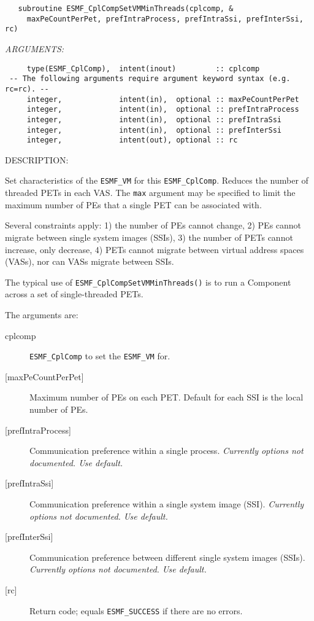   
\begin{verbatim}   subroutine ESMF_CplCompSetVMMinThreads(cplcomp, &
     maxPeCountPerPet, prefIntraProcess, prefIntraSsi, prefInterSsi, rc)\end{verbatim}{\em ARGUMENTS:}
\begin{verbatim}     type(ESMF_CplComp),  intent(inout)         :: cplcomp
 -- The following arguments require argument keyword syntax (e.g. rc=rc). --
     integer,             intent(in),  optional :: maxPeCountPerPet
     integer,             intent(in),  optional :: prefIntraProcess
     integer,             intent(in),  optional :: prefIntraSsi
     integer,             intent(in),  optional :: prefInterSsi
     integer,             intent(out), optional :: rc\end{verbatim}
{\sf DESCRIPTION:\\ }


     Set characteristics of the {\tt ESMF\_VM} for this {\tt ESMF\_CplComp}.
     Reduces the number of threaded PETs in each VAS. The {\tt max} argument
     may be specified to limit the maximum number of PEs that a single PET
     can be associated with.
  
     Several constraints apply: 1) the number of PEs cannot change, 2) PEs
     cannot migrate between single system images (SSIs), 3) the number of PETs
     cannot increase, only decrease, 4) PETs cannot migrate between virtual
     address spaces (VASs), nor can VASs migrate between SSIs.
  
     The typical use of {\tt ESMF\_CplCompSetVMMinThreads()} is to run a
     Component across a set of single-threaded PETs.
  
   The arguments are:
   \begin{description}
   \item[cplcomp]
     {\tt ESMF\_CplComp} to set the {\tt ESMF\_VM} for.
   \item[{[maxPeCountPerPet]}]
     Maximum number of PEs on each PET.
     Default for each SSI is the local number of PEs.
   \item[{[prefIntraProcess]}]
     Communication preference within a single process.
     {\em Currently options not documented. Use default.}
   \item[{[prefIntraSsi]}]
     Communication preference within a single system image (SSI).
     {\em Currently options not documented. Use default.}
   \item[{[prefInterSsi]}]
     Communication preference between different single system images (SSIs).
     {\em Currently options not documented. Use default.}
   \item[{[rc]}]
     Return code; equals {\tt ESMF\_SUCCESS} if there are no errors.
   \end{description}
   
